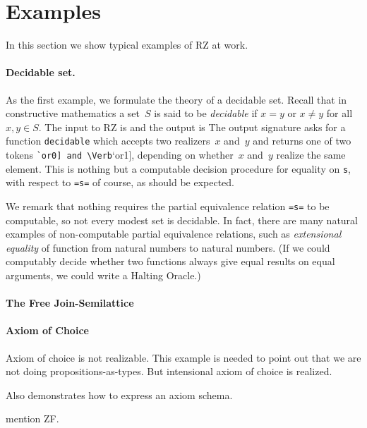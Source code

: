 \section{Examples}
\label{sec:examples}

In this section we show typical examples of RZ at work.

\paragraph{Decidable set.}
\label{sec:decidable-set}

As the first example, we formulate the theory of a decidable set.
Recall that in constructive mathematics a set~$S$ is said to be
\emph{decidable} if $x = y$ or $x \neq y$ for all $x, y \in S$.
The input to RZ is
%
{\small
{}
}
%
and the output is
%
{\small
{}
}
%
The output signature asks for a function \Verb|decidable| which
accepts two realizers~$x$ and~$y$ and returns one of two tokens
\Verb[`or0] and \Verb[`or1], depending on whether~$x$ and~$y$ realize
the same element. This is nothing but a computable decision procedure
for equality on \Verb|s|, with respect to \Verb|=s=| of course, as
should be expected.

We remark that nothing requires the partial equivalence relation
\Verb|=s=| to be computable, so not every modest set is decidable. In
fact, there are many natural examples of non-computable partial
equivalence relations, such as \emph{extensional equality} of function
from natural numbers to natural numbers. (If we could computably
decide whether two functions always give equal results on equal
arguments, we could write a Halting Oracle.)

\paragraph{The Free Join-Semilattice}
\label{sec:free-join-semil}



\paragraph{Axiom of Choice}
\label{sec:axiom-choice}

Axiom of choice is not realizable. This example is needed to point out
that we are not doing propositions-as-types. But intensional axiom of
choice is realized.

Also demonstrates how to express an axiom schema.

mention ZF.




